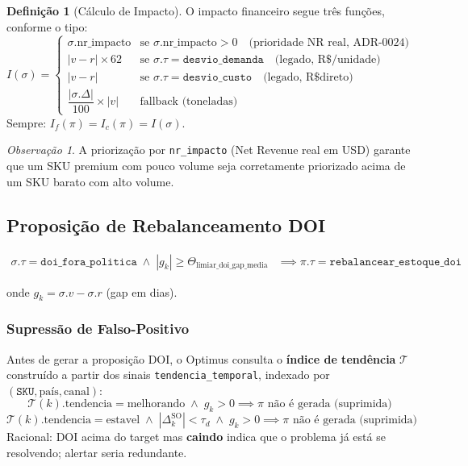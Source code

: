 \documentclass[a4paper, 12pt]{report}
\theoremstyle{definition}
\newtheorem{definicao}{Defini\c{c}\~ao}[chapter]
\theoremstyle{remark}
\newtheorem{observacao}{Observa\c{c}\~ao}[chapter]
\newcommand{\sku}{\texttt{SKU}}
\begin{document}
\begin{definicao}[C\'alculo de Impacto]
  O impacto financeiro segue tr\^es fun\c{c}\~oes, conforme o tipo:
  \[
    I(\sigma) = \begin{cases}
      \sigma.\text{nr\_impacto} & \text{se } \sigma.\text{nr\_impacto} > 0
        \quad \text{(prioridade NR real, ADR-0024)} \\[6pt]
      |v - r| \times 62 & \text{se } \sigma.\tau = \texttt{desvio\_demanda}
        \quad \text{(legado, R\$/unidade)} \\[6pt]
      |v - r| & \text{se } \sigma.\tau = \texttt{desvio\_custo}
        \quad \text{(legado, R\$ direto)} \\[6pt]
      \dfrac{|\sigma.\Delta|}{100} \times |v| & \text{fallback (toneladas)}
    \end{cases}
  \]
  Sempre: $I_f(\pi) = I_c(\pi) = I(\sigma)$.
\end{definicao}

\begin{observacao}
  A prioriza\c{c}\~ao por \texttt{nr\_impacto} (Net Revenue real em USD)
  garante que um SKU premium com pouco volume seja corretamente
  priorizado acima de um SKU barato com alto volume.
\end{observacao}


\subsection{Proposi\c{c}\~ao de Rebalanceamento DOI}

\begin{align}
  \sigma.\tau = \texttt{doi\_fora\_politica} \;\wedge\;
  |g_k| \geq \Theta_{\text{limiar\_doi\_gap\_media}} &\implies
  \pi.\tau = \texttt{rebalancear\_estoque\_doi}
\end{align}

onde $g_k = \sigma.v - \sigma.r$ (gap em dias).

\subsubsection{Supress\~ao de Falso-Positivo}

\begin{caixaguardrail}
  Antes de gerar a proposi\c{c}\~ao DOI, o Optimus consulta o
  \textbf{\'indice de tend\^encia} $\mathcal{T}$ constru\'ido a partir
  dos sinais \texttt{tendencia\_temporal}, indexado por
  $(\sku, \text{pa\'is}, \text{canal})$:
  \[
    \mathcal{T}(k).\text{tendencia} = \text{melhorando} \;\wedge\; g_k > 0
    \implies \pi \text{ n\~ao \'e gerada (suprimida)}
  \]
  \[
    \mathcal{T}(k).\text{tendencia} = \text{estavel} \;\wedge\;
    |\Delta^{\text{SO}}_k| < \tau_d \;\wedge\; g_k > 0
    \implies \pi \text{ n\~ao \'e gerada (suprimida)}
  \]
  Racional: DOI acima do target mas \textbf{caindo} indica que o
  problema j\'a est\'a se resolvendo; alertar seria redundante.
\end{caixaguardrail}
\end{document}
